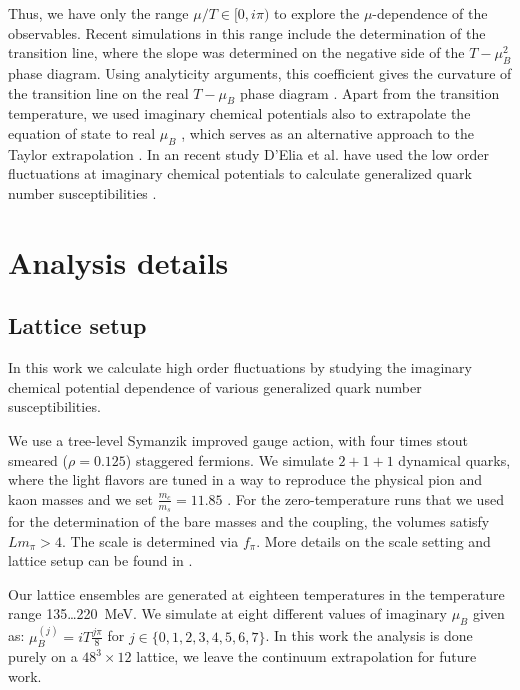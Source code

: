 \documentclass[a4paper,11pt]{article}
\begin{document}
Thus, we have only the range $\mu/T \in [0,i\pi)$ to explore the
$\mu$-dependence of the observables.  Recent simulations in this range include
the determination of the transition line, where the slope was determined on the
negative side of  the $T - \mu_B^2$ phase diagram. Using analyticity arguments,
this coefficient gives the curvature of the transition line on the real $T
-\mu_B$ phase diagram \cite{Bonati:2015bha,Bellwied:2015rza,Cea:2015cya}.
Apart from the transition temperature, we used imaginary chemical potentials
also to extrapolate the equation of state to real $\mu_B$
\cite{Gunther:2016vcp}, which serves as an alternative approach to the Taylor
extrapolation \cite{Bazavov:2017dus}. In an recent study D'Elia et al. have
used the low order fluctuations at imaginary chemical potentials to
calculate generalized quark number susceptibilities \cite{DElia:2016jqh}.

\section{Analysis details\label{sec:ana}}

\subsection{Lattice setup\label{sec:setup}}

In this work we calculate high order fluctuations by studying the imaginary
chemical potential dependence of various generalized quark number susceptibilities.

We use a tree-level Symanzik improved gauge action, with four times stout
smeared ($\rho = 0.125$) staggered fermions. We simulate $2+1+1$ dynamical
quarks, where the light flavors are tuned in a way to reproduce the physical
pion and kaon masses and we set $\frac{m_c}{m_s} = 11.85$
\cite{McNeile:2010ji}.  For the zero-temperature runs that we used for the determination of
the bare masses and the coupling, the volumes satisfy $L m_{\pi} > 4$. 
The scale is determined via $f_{\pi}$. More details on the scale setting and
lattice setup can be found in \cite{Bellwied:2015lba}.

Our lattice ensembles are generated at eighteen temperatures
in the temperature range 135\dots 220~MeV. 
We simulate at eight different values of imaginary $\mu_B$ given as: $
\mu_B^{(j)} = i T \frac{j \pi}{8}$ for $j \in \{0, 1, 2, 3, 4, 5,6,7\}$.
In this work the analysis is done purely on a $48^3 \times 12$ lattice, we leave the continuum
extrapolation for future work. 
\end{document}
